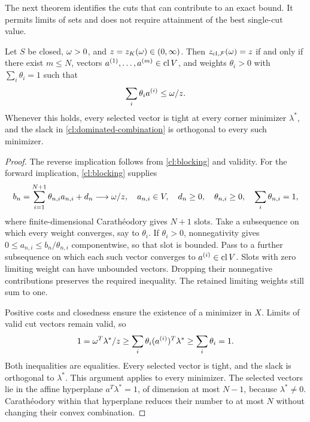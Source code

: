 The next theorem identifies the cuts that can contribute to an exact bound.
It permits limits of sets and does not require attainment of the best
single-cut value.

\begin{theorem}\label{cl:tight}
Let $S$ be closed, $\omega>0$, and $z=z_K(\omega)\in(0,\infty)$.
Then $z_{\mathrm{cl},\mathcal F}(\omega)=z$ if and only if there exist
$m\le N$, vectors $a^{(1)},\ldots,a^{(m)}\in\operatorname{cl} V$, and
weights $\theta_i>0$ with $\sum_i\theta_i=1$ such that
\begin{equation}\label{cl:dominated-combination}
 \sum_i\theta_i a^{(i)}\le\omega/z.
\end{equation}
Whenever this holds, every selected vector is tight at every corner
minimizer $\lambda^*$, and the slack in
\cref{cl:dominated-combination} is orthogonal to every such minimizer.
\end{theorem}

\begin{proof}
The reverse implication follows from \cref{cl:blocking} and validity.
For the forward implication, \cref{cl:blocking} supplies
\[
 b_n=\sum_{i=1}^{N+1}\theta_{n,i}a_{n,i}+d_n\longrightarrow\omega/z,
 \quad a_{n,i}\in V,\quad d_n\ge0,\quad
 \theta_{n,i}\ge0,\quad\sum_i\theta_{n,i}=1,
\]
where finite-dimensional Carath\'eodory gives $N+1$ slots.
Take a subsequence on which every weight converges, say to $\theta_i$.
If $\theta_i>0$, nonnegativity gives
$0\le a_{n,i}\le b_n/\theta_{n,i}$ componentwise, so that slot is bounded.
Pass to a further subsequence on which each such vector converges to
$a^{(i)}\in\operatorname{cl} V$. Slots with zero limiting weight can have unbounded
vectors. Dropping their nonnegative contributions preserves the required
inequality. The retained limiting weights still sum to one.

Positive costs and closedness ensure the existence of a minimizer in $X$.
Limits of valid cut vectors remain valid, so
\[
 1=\omega^T\lambda^*/z
 \ge\sum_i\theta_i(a^{(i)})^T\lambda^*
 \ge\sum_i\theta_i=1.
\]
Both inequalities are equalities. Every selected vector is tight, and
the slack is orthogonal to $\lambda^*$. This argument applies to every
minimizer. The selected vectors lie in the affine hyperplane
$a^T\lambda^*=1$, of dimension at most $N-1$, because $\lambda^*\ne0$.
Carath\'eodory within that hyperplane reduces their number to at most $N$
without changing their convex combination.
\end{proof}

